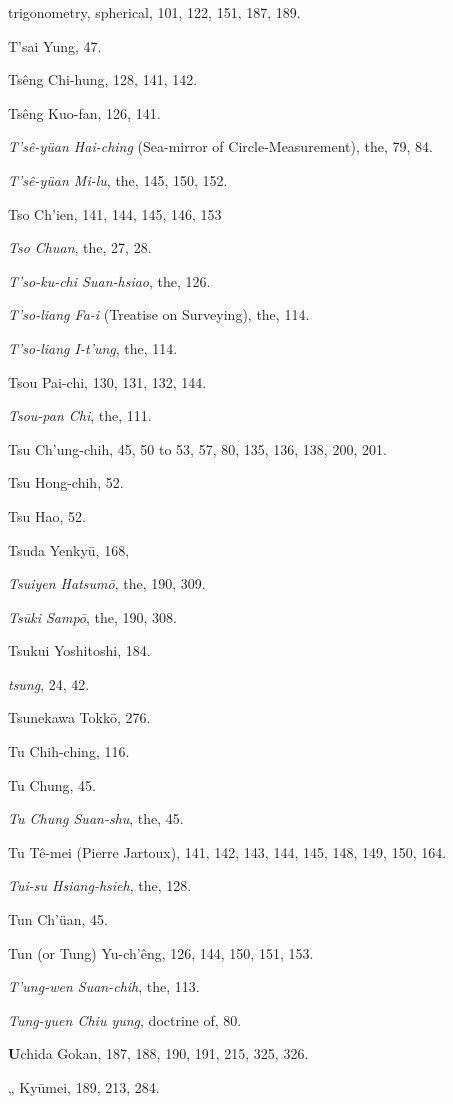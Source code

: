 \documentclass[11pt]{article}
\begin{document}
trigonometry, spherical, 101, 122, 151, 187, 189.\par
T'sai Yung, 47.\par
Tsêng Chi-hung, 128, 141, 142.\par
Tsêng Kuo-fan, 126, 141.\par
\emph{T'sê-yüan Hai-ching} (Sea-mirror of Circle-Measurement), the, 79, 84.\par
\emph{T'sê-yüan Mi-lu}, the, 145, 150, 152.\par
Tso Ch'ien, 141, 144, 145, 146, 153\par
\emph{Tso Chuan}, the, 27, 28.\par
\emph{T'so-ku-chi Suan-hsiao}, the, 126.\par
\emph{T'so-liang Fa-i} (Treatise on Surveying), the, 114.\par
\emph{T'so-liang I-t'ung}, the, 114.\par
Tsou Pai-chi, 130, 131, 132, 144.\par
\emph{Tsou-pan Chi}, the, 111.\par
Tsu Ch'ung-chih, 45, 50 to 53, 57, 80, 135, 136, 138, 200, 201.\par
Tsu Hong-chih, 52.\par
Tsu Hao, 52.\par
Tsuda Yenkyū, 168,\par
\emph{Tsuiyen Hatsumō}, the, 190, 309.\par
\emph{Tsūki Sampō}, the, 190, 308.\par
Tsukui Yoshitoshi, 184.\par
\emph{tsung}, 24, 42.\par
Tsunekawa Tokkō, 276.\par
Tu Chih-ching, 116.\par
Tu Chung, 45.\par
\emph{Tu Chung Suan-shu}, the, 45.\par
Tu Tê-mei (Pierre Jartoux), 141, 142, 143, 144, 145, 148, 149, 150, 164.\par
\emph{Tui-su Hsiang-hsieh}, the, 128.\par
Tun Ch'üan, 45.\par
Tun (or Tung) Yu-ch'êng, 126, 144, 150, 151, 153.\par
\emph{T'ung-wen Suan-chih}, the, 113.\par
\emph{Tung-yuen Chiu yung}, doctrine of, 80.\par
\medskip
\textbf{U}chida Gokan, 187, 188, 190, 191, 215, 325, 326.\par
\quad „ Kyūmei, 189, 213, 284.\par
\end{document}
